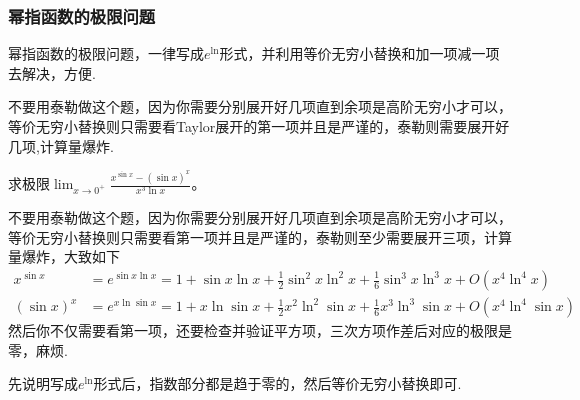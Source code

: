 \documentclass[../../main.tex]{subfiles}%
\begin{document}
\subsubsection{幂指函数的极限问题}
幂指函数的极限问题，一律写成\(e^{\ln}\)形式，并利用等价无穷小替换和加一项减一项去解决，方便.

\begin{remark}
不要用泰勒做这个题，因为你需要分别展开好几项直到余项是高阶无穷小才可以，等价无穷小替换则只需要看Taylor展开的第一项并且是严谨的，泰勒则需要展开好几项,计算量爆炸.  
\end{remark}
\begin{example}
求极限\(\lim_{x\rightarrow0^{+}}\frac{x^{\sin x}-(\sin x)^{x}}{x^{3}\ln x}\)。
\end{example}
\begin{remark}
不要用泰勒做这个题，因为你需要分别展开好几项直到余项是高阶无穷小才可以，等价无穷小替换则只需要看第一项并且是严谨的，泰勒则至少需要展开三项，计算量爆炸，大致如下
\begin{align*}
x^{\sin x}&=e^{\sin x\ln x}=1+\sin x\ln x+\frac{1}{2}\sin^{2}x\ln^{2}x+\frac{1}{6}\sin^{3}x\ln^{3}x+O(x^{4}\ln^{4}x)\\
(\sin x)^{x}&=e^{x\ln\sin x}=1 + x\ln\sin x+\frac{1}{2}x^{2}\ln^{2}\sin x+\frac{1}{6}x^{3}\ln^{3}\sin x+O(x^{4}\ln^{4}\sin x)
\end{align*}
然后你不仅需要看第一项，还要检查并验证平方项，三次方项作差后对应的极限是零，麻烦. 
\end{remark}
\begin{note}
先说明写成\(e^{\ln}\)形式后，指数部分都是趋于零的，然后等价无穷小替换即可.
\end{note}
\end{document}
